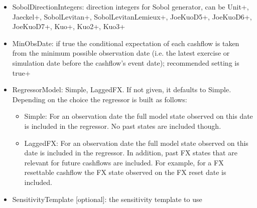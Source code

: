 \begin{itemize}
\item SobolDirectionIntegers: direction integers for Sobol generator, can be Unit+, Jaeckel+, SobolLevitan+,
  SobolLevitanLemieux+, JoeKuoD5+, JoeKuoD6+, JoeKuoD7+, Kuo+, Kuo2+, Kuo3+
\item MinObsDate: if true the conditional expectation of each cashflow is taken from the minimum possible observation
  date (i.e. the latest exercise or simulation date before the cashflow's event date); recommended setting is true+
\item RegressorModel: Simple, LaggedFX. If not given, it defaults to Simple. Depending on the choice the regressor is
  built as follows:
  \begin{itemize}
    \item Simple: For an observation date the full model state observed on this date is included in the regressor. No
      past states are included though.
    \item LaggedFX: For an observation date the full model state observed on this date is included in the regressor. In
      addition, past FX states that are relevant for future cashflows are included. For example, for a FX resettable
      cashflow the FX state observed on the FX reset date is included.
  \end{itemize}
\item SensitivityTemplate [optional]: the sensitivity template to use
\end{itemize}


